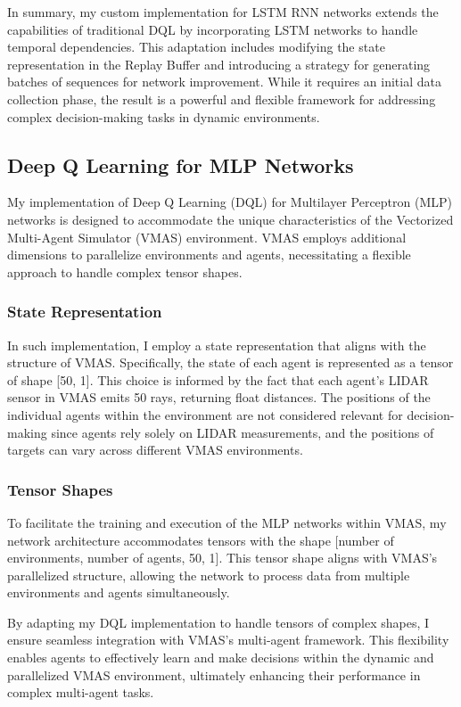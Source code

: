 \documentclass{scrartcl}
\begin{document}
In summary, my custom implementation for LSTM RNN networks extends the capabilities of traditional DQL by incorporating LSTM networks to handle temporal dependencies. This adaptation includes modifying the state representation in the Replay Buffer and introducing a strategy for generating batches of sequences for network improvement. While it requires an initial data collection phase, the result is a powerful and flexible framework for addressing complex decision-making tasks in dynamic environments.

\subsection{Deep Q Learning for MLP Networks}

My implementation of Deep Q Learning (DQL) for Multilayer Perceptron (MLP) networks is designed to accommodate the unique 
characteristics of the Vectorized Multi-Agent Simulator (VMAS) environment. VMAS employs additional dimensions to parallelize 
environments and agents, necessitating a flexible approach to handle complex tensor shapes.

\subsubsection{State Representation}

In such implementation, I employ a state representation that aligns with the structure of VMAS. Specifically, the state of each agent is represented as a tensor of shape [50, 1]. This choice is informed by the fact that each agent's LIDAR sensor in VMAS emits 50 rays, returning float distances. The positions of the individual agents within the environment are not considered relevant for decision-making since agents rely solely on LIDAR measurements, and the positions of targets can vary across different VMAS environments.

\subsubsection{Tensor Shapes}

To facilitate the training and execution of the MLP networks within VMAS, my network architecture accommodates tensors with the shape [number of environments, number of agents, 50, 1]. This tensor shape aligns with VMAS's parallelized structure, allowing the network to process data from multiple environments and agents simultaneously.

By adapting my DQL implementation to handle tensors of complex shapes, I ensure seamless integration with VMAS's multi-agent framework. This flexibility enables agents to effectively learn and make decisions within the dynamic and parallelized VMAS environment, ultimately enhancing their performance in complex multi-agent tasks.
\end{document}
